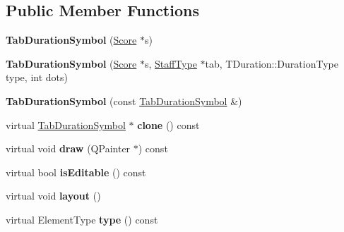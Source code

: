 \subsection*{Public Member Functions}
\begin{DoxyCompactItemize}
\item 
\mbox{\label{class_ms_1_1_tab_duration_symbol_a335e8b0b6166534c4d9284df5c01b342}} 
{\bfseries Tab\+Duration\+Symbol} (\hyperlink{class_ms_1_1_score}{Score} $\ast$s)
\item 
\mbox{\label{class_ms_1_1_tab_duration_symbol_a729dbc2a9a3613a010b1ac75ebb6d5e2}} 
{\bfseries Tab\+Duration\+Symbol} (\hyperlink{class_ms_1_1_score}{Score} $\ast$s, \hyperlink{class_ms_1_1_staff_type}{Staff\+Type} $\ast$tab, T\+Duration\+::\+Duration\+Type type, int dots)
\item 
\mbox{\label{class_ms_1_1_tab_duration_symbol_a84f29164a91c085784b3a04d2e895ef9}} 
{\bfseries Tab\+Duration\+Symbol} (const \hyperlink{class_ms_1_1_tab_duration_symbol}{Tab\+Duration\+Symbol} \&)
\item 
\mbox{\label{class_ms_1_1_tab_duration_symbol_a92e3907054b6e2a409cbc3b77a64f2b5}} 
virtual \hyperlink{class_ms_1_1_tab_duration_symbol}{Tab\+Duration\+Symbol} $\ast$ {\bfseries clone} () const
\item 
\mbox{\label{class_ms_1_1_tab_duration_symbol_abd51fd79f446545b4ff895b79d77fbd2}} 
virtual void {\bfseries draw} (Q\+Painter $\ast$) const
\item 
\mbox{\label{class_ms_1_1_tab_duration_symbol_ad1299aa8d3312afe4a537a5b3a2168f9}} 
virtual bool {\bfseries is\+Editable} () const
\item 
\mbox{\label{class_ms_1_1_tab_duration_symbol_af25698368816aedc2d68df57c152337c}} 
virtual void {\bfseries layout} ()
\item 
\mbox{\label{class_ms_1_1_tab_duration_symbol_abb5b57415e0f26ed24255f9e2cee026f}} 
virtual Element\+Type {\bfseries type} () const

\end{DoxyCompactItemize}
